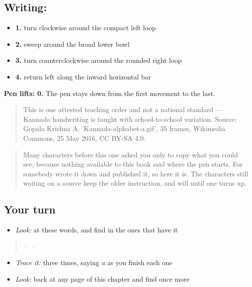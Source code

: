 \subsection*{Writing: }

\begin{itemize}
\raggedright
  \item \textbf{1.} turn clockwise around the compact left loop
  \item \textbf{2.} sweep around the broad lower bowl
  \item \textbf{3.} turn counterclockwise around the rounded right loop
  \item \textbf{4.} return left along the inward horizontal bar
\end{itemize}

\textbf{Pen lifts: 0.} The pen stays down from the first movement to the last.

\begin{quote}
This is one attested teaching order and not a national standard — Kannada handwriting is taught with school-to-school variation. Source: Gopala Krishna A, 'Kannada-alphabet-a.gif', 35 frames, Wikimedia Commons, 25 May 2016, CC BY-SA 4.0.
\end{quote}

\begin{quote}
Many characters before this one asked you only to copy what you could see, because nothing available to this book said where the pen starts. For  somebody wrote it down and published it, so here it is. The characters still waiting on a source keep the older instruction, and will until one turns up.
\end{quote}

\subsection*{Your turn}
\begin{itemize}
\raggedright
  \item \emph{Look:} at these words, and find  in the ones that have it
\end{itemize}

\begin{quote}
  ·    ·  
\end{quote}

\begin{itemize}
\raggedright
  \item \emph{Trace it:}  three times, saying \emph{a} as you finish each one
  \item \emph{Look:} back at any page of this chapter and find  once more
\end{itemize}

